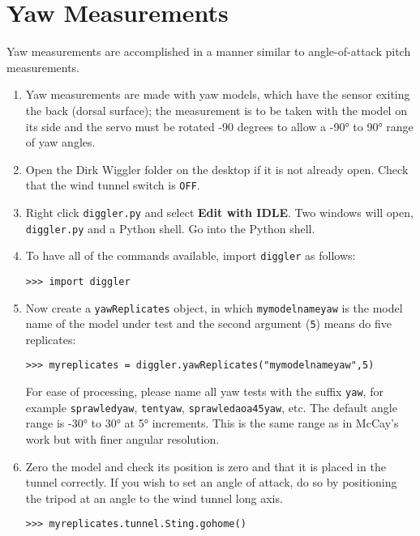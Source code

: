 \documentclass{article}
\begin{document}
\section{Yaw Measurements}
Yaw measurements are accomplished in a manner similar to angle-of-attack pitch measurements.

\begin{enumerate}
\item{Yaw measurements are made with yaw models, which have the sensor exiting the back (dorsal surface); the measurement is to be taken with the model on its side and the servo must be rotated -90 degrees to allow a \ang{-90} to \ang{90} range of yaw angles.}

\item{Open the Dirk Wiggler folder on the desktop if it is not already open. Check that the wind tunnel switch is {\tt OFF}.}

\item{Right click {\tt diggler.py} and select {\bf Edit with IDLE}.  Two windows will open, {\tt diggler.py} and a Python shell.  Go into the Python shell.}


\item{To have all of the commands available, import {\tt diggler} as follows:
\begin{verbatim}
>>> import diggler
\end{verbatim}
}

\item{Now create a {\tt yawReplicates} object, in which {\tt mymodelnameyaw} is the model name of the model under test and the second argument ({\tt 5}) means do five replicates:
\begin{verbatim}
>>> myreplicates = diggler.yawReplicates("mymodelnameyaw",5)
\end{verbatim}
}
For ease of processing, please name all yaw tests with the suffix {\tt yaw}, for example {\tt sprawledyaw}, {\tt tentyaw}, {\tt sprawledaoa45yaw}, etc.  The default angle range is \ang{-30} to \ang{30} at \ang{5} increments.  This is the same range as in McCay's work but with finer angular resolution. 

\item{Zero the model and check its position is zero and that it is placed in the tunnel correctly.  If you wish to set an angle of attack, do so by positioning the tripod at an angle to the wind tunnel long axis.  

\begin{verbatim}
>>> myreplicates.tunnel.Sting.gohome()
\end{verbatim}}


\end{enumerate}
\end{document}
